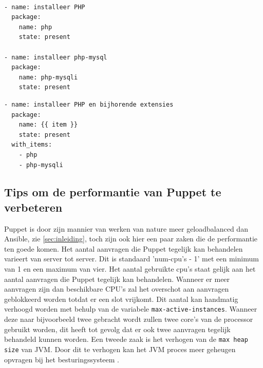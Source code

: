 \begin{lstlisting}[frame=single]

- name: installeer PHP
  package:
    name: php
    state: present

- name: installeer php-mysql
  package:
    name: php-mysqli
    state: present
\end{lstlisting}

\begin{lstlisting}[frame=single]
- name: installeer PHP en bijhorende extensies
  package:
    name: {{ item }}
    state: present
  with_items:
    - php
    - php-mysqli
\end{lstlisting}

  
  
 \subsection{Tips om de performantie van Puppet te verbeteren}
 Puppet is door zijn mannier van werken van nature meer geloadbalanced dan Ansible, zie \ref{sec:inleiding}, toch zijn ook hier een paar zaken die de performantie ten goede komen. Het aantal aanvragen die Puppet tegelijk kan behandelen varieert van server tot server. Dit is standaard 'num-cpu's - 1' met een minimum van 1 en een maximum van vier. Het aantal gebruikte cpu's staat gelijk aan het aantal aanvragen die Puppet tegelijk kan behandelen. Wanneer er meer aanvragen zijn dan beschikbare CPU's zal het overschot aan aanvragen geblokkeerd worden totdat er een slot vrijkomt. Dit aantal kan handmatig verhoogd worden met behulp van de variabele \texttt{max-active-instances}. Wanneer deze naar bijvoorbeeld twee gebracht wordt zullen twee core's van de processor gebruikt worden, dit heeft tot gevolg dat er ook twee aanvragen tegelijk behandeld kunnen worden. \newline
 Een tweede zaak is het verhogen van de \texttt{max heap size} van JVM. Door dit te verhogen kan het JVM proces meer geheugen opvragen bij het besturingssysteem \autocite{PuppetTuning}.
 
